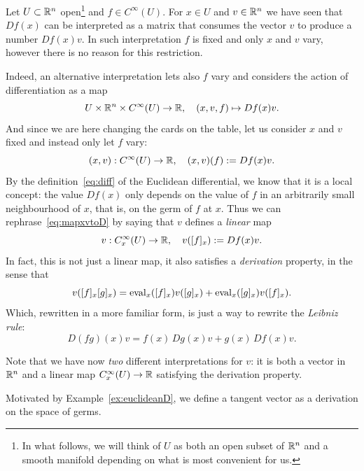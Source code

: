 \begin{example}\label{ex:euclideanD}
	Let $U\subset\mathbb{R}^n$ open\footnote{In what follows, we will think of $U$ as both an open subset of $\mathbb{R}^n$ and a smooth manifold depending on what is most convenient for us.} and $f\in C^\infty(U)$.
	For $x\in U$ and $v\in\mathbb{R}^n$ we have seen that $Df(x)$ can be interpreted as a matrix that consumes the vector $v$ to produce a number $Df(x)v$.
	In such interpretation $f$ is fixed and only $x$ and $v$ vary, however there is no reason for this restriction.

	Indeed, an alternative interpretation lets also $f$ vary and considers the action of differentiation as a map
	\begin{equation}
		U \times \mathbb{R}^n \times C^\infty(U) \to \mathbb{R},\quad
		(x,v,f) \mapsto Df(x) v.
	\end{equation}
	And since we are here changing the cards on the table, let us consider $x$ and $v$ fixed and instead only let $f$ vary:
	\begin{equation}\label{eq:mapxvtoD}
		(x,v):C^\infty(U) \to\mathbb{R}, \quad (x,v)(f) := Df(x)v.
	\end{equation}
	By the definition~\eqref{eq:diff} of the Euclidean differential, we know that it is a local concept: the value $Df(x)$ only depends on the value of $f$ in an arbitrarily small neighbourhood of $x$, that is, on the germ of $f$ at $x$.
	Thus we can rephrase~\eqref{eq:mapxvtoD} by saying that $v$ defines a \emph{linear} map
	\begin{equation}
		v : C_x^\infty(U) \to \mathbb{R}, \quad
		v([f]_x) := Df(x) v.
	\end{equation}
	In fact, this is not just a linear map, it also satisfies a \emph{derivation} property, in the sense that
	\begin{equation}
		v([f]_x [g]_x) =
		\operatorname{eval}_x([f]_x)v([g]_x)
		+ \operatorname{eval}_x([g]_x)v([f]_x).
	\end{equation}
	Which, rewritten in a more familiar form, is just a way to rewrite the \emph{Leibniz rule}:
	\begin{equation}
		D(fg)(x) v = f(x)\,Dg(x)v + g(x)\,Df(x)v.
	\end{equation}

	Note that we have now \emph{two} different interpretations for $v$: it is both a vector in $\mathbb{R}^n$ and a linear map $C_x^\infty(U) \to \mathbb{R}$ satisfying the derivation property.
\end{example}

Motivated by Example~\ref{ex:euclideanD}, we define a tangent vector as a derivation on the space of germs.


